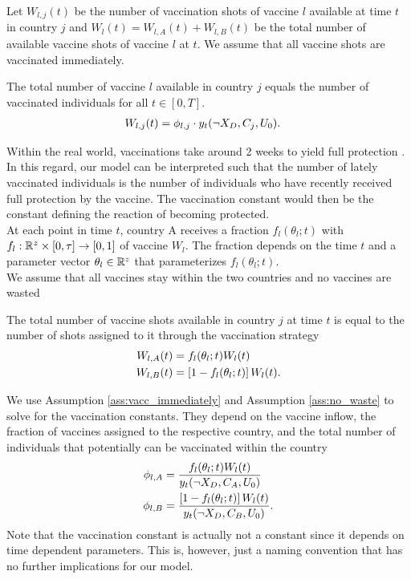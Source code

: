 Let $W_{l,j}(t)$ be the number of vaccination shots of vaccine $l$ available at time $t$ in country $j$ and $W_l(t) = W_{l,A}(t) + W_{l,B}(t)$ be the total number of available vaccine shots of vaccine $l$ at $t$. We assume that all vaccine shots are vaccinated immediately.
\begin{assumption}
\label{ass:vacc_immediately}
The total number of vaccine $l$ available in country $j$ equals the number of vaccinated individuals for all $t \in [0, T]$. 
\begin{align}
\label{eq:vaccine_country}
W_{l,j}(t) &= \phi_{l, j} \cdot y_t(\neg X_D, C_j, U_0)  . 
\end{align}
\end{assumption}
\noindent Within the real world, vaccinations take around 2 weeks to yield full protection \citep{cdc.2021}. In this regard, our model can be interpreted such that the number of lately vaccinated individuals is the number of individuals who have recently received full protection by the vaccine. The vaccination constant would then be the constant defining the reaction of becoming protected. \\

At each point in time $t$, country A receives a fraction $f_{l}(\theta_l; t)$ with $f_{l}: \mathbb{R}^{z} \times [0, \tau] \to [0,1]$ of vaccine $W_l$. The fraction depends on the time $t$ and a parameter vector $\theta_l \in \mathbb{R}^{z}$ that parameterizes $f_{l}(\theta_l; t)$.\\

We assume that all vaccines stay within the two countries and no vaccines are wasted
\begin{assumption}
\label{ass:no_waste}
The total number of vaccine shots available in country $j$ at time $t$ is equal to the number of shots assigned to it through the vaccination strategy
\begin{align}
\label{eq:vaccine_frac}
W_{l,A}(t) &= f_{l}(\theta_l; t) W_l(t) \\
W_{l,B}(t) &= \left[1 - f_{l}(\theta_l; t)\right] W_l(t) \notag.
\end{align}
\end{assumption}
\noindent We use Assumption \ref{ass:vacc_immediately} and Assumption \ref{ass:no_waste} to solve for the vaccination constants. They depend on the vaccine inflow, the fraction of vaccines assigned to the respective country, and the total number of individuals that potentially can be vaccinated within the country
\begin{align*}
\phi_{l,A} &= \frac{ f_{l}(\theta_l; t) W_{l}(t)}{y_t(\neg X_D, C_A, U_0) } \notag \\
\phi_{l,B} &= \frac{\left[1 - f_{l}(\theta_l; t)\right]  W_{l}(t)}{y_t(\neg X_D, C_B, U_0)}.
\end{align*}
Note that the vaccination constant is actually not a constant since it depends on time dependent parameters. This is, however, just a naming convention that has no further implications for our model.

